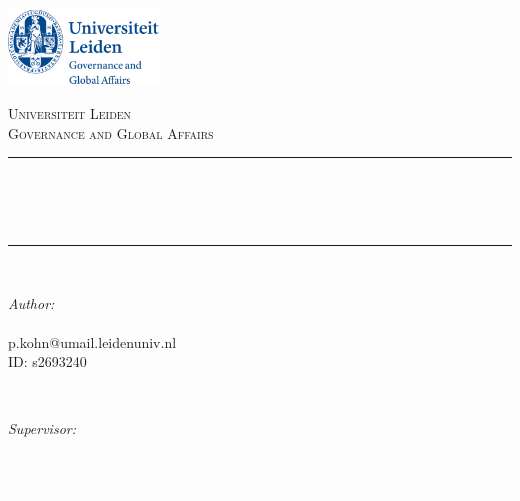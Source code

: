 \begin{titlepage}

\newcommand{\HRule}{\rule{\linewidth}{0.25mm}} %



\includegraphics[width = 4cm]{./src/template/headerlogo}\\[0.5cm] 

\center %


\textsc{\Large Universiteit Leiden}\\[0.5cm] 
\textsc{\large Governance and Global Affairs}\\[0.5cm] 


\HRule \\[0.4cm]
{ \huge \bfseries \reporttitle}\\[0.5cm] 
{\it \reportsubtitle}\\
\HRule \\[1.5cm]
 

\begin{minipage}{0.4\textwidth}
\begin{flushleft} \large
\emph{Author:}\\
\reportauthor \\%
\small
p.kohn@umail.leidenuniv.nl\\
ID: s2693240
\end{flushleft}
\end{minipage}
~
\begin{minipage}{0.4\textwidth}
\begin{flushright} \large
\emph{Supervisor:} \\
\supervisor \\
\small
\textcolor{white}{.}\\ 
\textcolor{white}{.}\\ %
\end{flushright}
\end{minipage}\\[4cm]


\end{titlepage}
